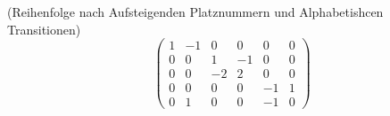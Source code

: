 (Reihenfolge nach Aufsteigenden Platznummern und Alphabetishcen Transitionen)
\[\begin{pmatrix}
1&-1&0&0&0&0\\
0&0&1&-1&0&0\\
0&0&-2&2&0&0\\
0&0&0&0&-1&1\\
0&1&0&0&-1&0
\end{pmatrix}
\]